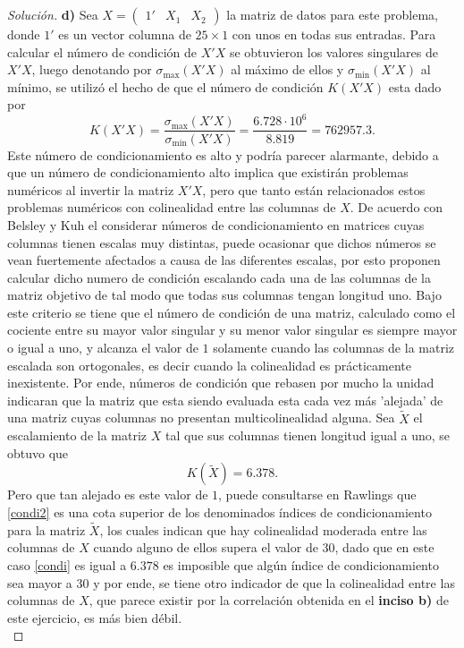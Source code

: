 \documentclass[10.5pt,notitlepage]{article}
\newenvironment{solucion}
  {\begin{proof}[Solución]}
  {\end{proof}}
\theoremstyle{plain}
\begin{document}
\begin{solucion}
\noindent \textbf{d)} 
Sea \(X = \begin{pmatrix}1' &X_1 & X_2 \end{pmatrix}\) la matriz de datos para este problema, donde \(1'\) es un vector columna de \(25 \times 1\) con unos en todas sus entradas. Para calcular el número de condición de \(X'X\) se obtuvieron los valores singulares de \(X'X\), luego denotando por \(\sigma_{\max}(X'X)\) al máximo de ellos y \(\sigma_{\min}(X'X)\) al mínimo, se utilizó el hecho de que el número de condición \(K(X'X)\) esta dado por 
\begin{equation}\label{condi}
    K(X'X) = \frac{\sigma_{\max}(X'X)}{\sigma_{\min}(X'X)}= \frac{6.728\cdot10^{6}}{8.819}= 762957.3.
\end{equation}
Este número de condicionamiento es alto y podría parecer alarmante, debido a que un número de condicionamiento alto implica que existirán problemas numéricos al invertir la matriz \(X'X\), pero que tanto están relacionados estos problemas numéricos con colinealidad entre las columnas de \(X\). De acuerdo con Belsley y Kuh el considerar números de condicionamiento en matrices cuyas columnas tienen escalas muy distintas, puede ocasionar que dichos números se vean fuertemente afectados a causa de las diferentes escalas, por esto proponen calcular dicho numero de condición escalando cada una de las columnas de la matriz objetivo de tal modo que todas sus columnas tengan longitud uno. Bajo este criterio se tiene que el número de condición de una matriz, calculado como el cociente entre su mayor valor singular y su menor valor singular es siempre mayor o igual a uno, y alcanza el valor de \(1\) solamente cuando las columnas de la matriz escalada son ortogonales, es decir cuando la colinealidad es prácticamente inexistente. Por ende, números de condición que rebasen por mucho la unidad indicaran que la matriz que esta siendo evaluada esta cada vez más 'alejada' de una matriz cuyas columnas no presentan multicolinealidad alguna. Sea \(\tilde{X}\) el escalamiento de la matriz \(X\) tal que sus columnas tienen longitud igual a uno, se obtuvo que 
\begin{equation}\label{condi2}
    K(\tilde{X}) = 6.378. 
\end{equation}
Pero que tan alejado es este valor de \(1\), puede consultarse en Rawlings que \ref{condi2} es una cota superior de los denominados índices de condicionamiento para la matriz \(\tilde{X}\), los cuales indican que hay colinealidad moderada entre las columnas de \(X\) cuando alguno de ellos supera el valor de \(30\), dado que en este caso \eqref{condi} es igual a \(6.378\) es imposible que algún índice de condicionamiento sea mayor a \(30\) y por ende, se tiene otro indicador de que la colinealidad entre las columnas de \(X\), que parece existir por la correlación obtenida en el \textbf{inciso b)} de este ejercicio, es más bien débil. \\ 


\end{solucion}
\end{document}
